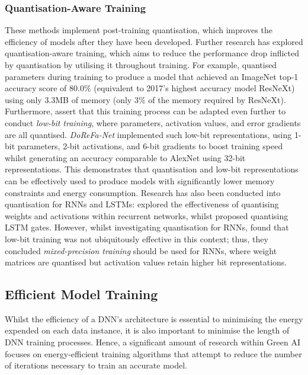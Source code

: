 \documentclass[a4paper, 11pt]{report}
\begin{document}
    \subsubsection{Quantisation-Aware Training}
    \label{section: quantisation-training}

    These methods implement post-training quantisation, which improves the efficiency of models after they have been developed. Further research has explored quantisation-aware training, which aims to reduce the performance drop inflicted by quantisation by utilising it throughout training. For example, \citet{fan-2020b} quantised parameters during training to produce a model that achieved an ImageNet top-1 accuracy score of $80.0\%$ (equivalent to 2017's highest accuracy model ResNeXt) using only $3.3$MB of memory (only $3\%$ of the memory required by ResNeXt). Furthermore, \citet{cai-2022} assert that this training process can be adapted even further to conduct \emph{low-bit training}, where parameters, activation values, and error gradients are all quantised. \emph{DoReFa-Net} \citep{zhou-2016} implemented such low-bit representations, using 1-bit parameters, 2-bit activations, and 6-bit gradients to boost training speed whilst generating an accuracy comparable to AlexNet using 32-bit representations. This demonstrates that quantisation and low-bit representations can be effectively used to produce models with significantly lower memory constraints and energy consumption. Research has also been conducted into quantisation for RNNs and LSTMs: \citet{hubara-2016} explored the effectiveness of quantising weights and activations within recurrent networks, whilst \citet{he-2016} proposed quantising LSTM gates. However, whilst investigating quantisation for RNNs, \citet{ott-2017} found that low-bit training was not ubiquitously effective in this context; thus, they concluded \emph{mixed-precision training} should be used for RNNs, where weight matrices are quantised but activation values retain higher bit representations.


    \subsection{Efficient Model Training}
    \label{section: efficient-training}

    Whilst the efficiency of a DNN's architecture is essential to minimising the energy expended on each data instance, it is also important to minimise the length of DNN training processes. Hence, a significant amount of research within Green AI focuses on energy-efficient training algorithms that attempt to reduce the number of iterations necessary to train an accurate model.
\end{document}
